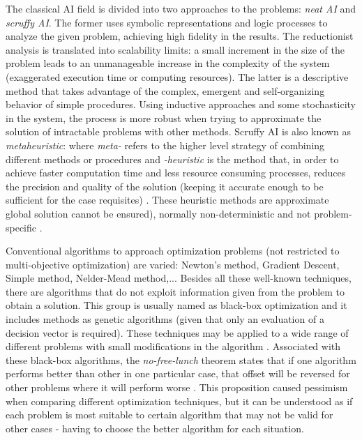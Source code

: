     
    The classical AI field is divided into two approaches to the problems: \textit{neat AI} and \textit{scruffy AI}. The former uses symbolic representations and logic processes to analyze the given problem, achieving high fidelity in the results. The reductionist analysis is translated into scalability limits: a small increment in the size of the problem leads to an unmanageable increase in the complexity of the system (exaggerated execution time or computing resources). The latter is a descriptive method that takes advantage of the complex, emergent and self-organizing behavior of simple procedures. Using inductive approaches and some stochasticity in the system, the process is more robust when trying to approximate the solution of intractable problems with other methods. Scruffy AI is also known as \textit{metaheuristic}: where \textit{meta-} refers to the higher level strategy of combining different methods or procedures and \textit{-heuristic} is the method that, in order to achieve faster computation time and less resource consuming processes, reduces the precision and quality of the solution (keeping it accurate enough to be sufficient for the case requisites) . These heuristic methods are approximate global solution cannot be ensured), normally non-deterministic and not problem-specific \cite{cleverAlgorithms}.
 
    Conventional algorithms to approach optimization problems (not restricted to multi-objective optimization) are varied: Newton's method, Gradient Descent, Simple method, Nelder-Mead method,... Besides all these well-known techniques, there are algorithms that do not exploit information given from the problem to obtain a solution. This group is usually named as black-box optimization and it includes methods as genetic algorithms (given that only an evaluation of a decision vector is required). These techniques may be applied to a wide range of different problems with small modifications in the algorithm \cite{droste2006upper}. Associated with these black-box algorithms, the \textit{no-free-lunch} theorem states that if one algorithm performs better than other in one particular case, that offset will be reversed for other problems where it will perform worse \cite{wolpert1997no}. This proposition caused pessimism when comparing different optimization techniques, but it can be understood as if each problem is most suitable to certain algorithm that may not be valid for other cases - having to choose the better algorithm for each situation.

\newpage

